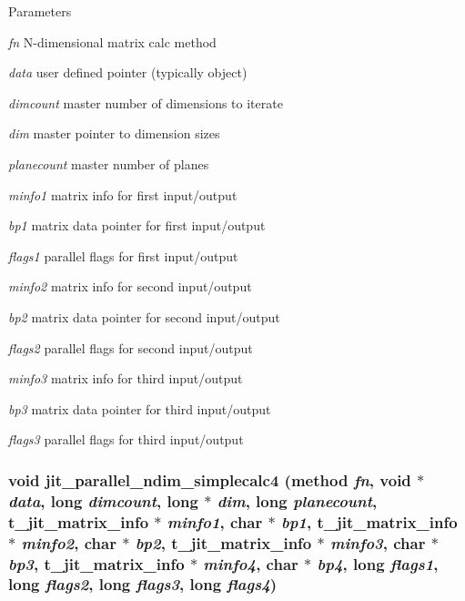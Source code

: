 \begin{DoxyParams}{Parameters}
\item[{\em fn}]N-\/dimensional matrix calc method \item[{\em data}]user defined pointer (typically object) \item[{\em dimcount}]master number of dimensions to iterate \item[{\em dim}]master pointer to dimension sizes \item[{\em planecount}]master number of planes \item[{\em minfo1}]matrix info for first input/output \item[{\em bp1}]matrix data pointer for first input/output \item[{\em flags1}]parallel flags for first input/output \item[{\em minfo2}]matrix info for second input/output \item[{\em bp2}]matrix data pointer for second input/output \item[{\em flags2}]parallel flags for second input/output \item[{\em minfo3}]matrix info for third input/output \item[{\em bp3}]matrix data pointer for third input/output \item[{\em flags3}]parallel flags for third input/output \end{DoxyParams}
\hypertarget{group__parallelutilmod_gaa8c8a53219e8e31057fdf4cea80e8081}{
\subsubsection[{jit\_\-parallel\_\-ndim\_\-simplecalc4}]{\setlength{\rightskip}{0pt plus 5cm}void jit\_\-parallel\_\-ndim\_\-simplecalc4 ({\bf method} {\em fn}, \/  void $\ast$ {\em data}, \/  long {\em dimcount}, \/  long $\ast$ {\em dim}, \/  long {\em planecount}, \/  {\bf t\_\-jit\_\-matrix\_\-info} $\ast$ {\em minfo1}, \/  char $\ast$ {\em bp1}, \/  {\bf t\_\-jit\_\-matrix\_\-info} $\ast$ {\em minfo2}, \/  char $\ast$ {\em bp2}, \/  {\bf t\_\-jit\_\-matrix\_\-info} $\ast$ {\em minfo3}, \/  char $\ast$ {\em bp3}, \/  {\bf t\_\-jit\_\-matrix\_\-info} $\ast$ {\em minfo4}, \/  char $\ast$ {\em bp4}, \/  long {\em flags1}, \/  long {\em flags2}, \/  long {\em flags3}, \/  long {\em flags4})}}
\label{group__parallelutilmod_gaa8c8a53219e8e31057fdf4cea80e8081}



